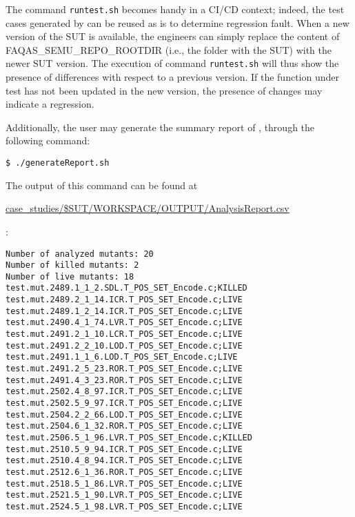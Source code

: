 The command \texttt{runtest.sh} becomes handy in a CI/CD context; indeed, the test cases generated by \SEMUS can be reused as is to determine regression fault. When a new version of the SUT is available, the engineers can simply replace the content of FAQAS\_SEMU\_REPO\_ROOTDIR (i.e., the folder with the SUT) with the newer SUT version. The execution of command \texttt{runtest.sh} will thus show the presence of differences with respect to a previous version. If the function under test has not been updated in the new version, the presence of changes may indicate a regression.

Additionally, the user may generate the summary report of \SEMUS, through the following command:

\begin{lstlisting}[language={}, label=listing:semus_results_3]
 $ ./generateReport.sh
\end{lstlisting}


The output of this command can be found at \begin{scriptsize}\url{case_studies/$SUT/WORKSPACE/OUTPUT/AnalysisReport.csv}\end{scriptsize}:

\begin{lstlisting}[language={}]
Number of analyzed mutants: 20
Number of killed mutants: 2
Number of live mutants: 18
test.mut.2489.1_1_2.SDL.T_POS_SET_Encode.c;KILLED
test.mut.2489.2_1_14.ICR.T_POS_SET_Encode.c;LIVE
test.mut.2489.1_2_14.ICR.T_POS_SET_Encode.c;LIVE
test.mut.2490.4_1_74.LVR.T_POS_SET_Encode.c;LIVE
test.mut.2491.2_1_10.LCR.T_POS_SET_Encode.c;LIVE
test.mut.2491.2_2_10.LOD.T_POS_SET_Encode.c;LIVE
test.mut.2491.1_1_6.LOD.T_POS_SET_Encode.c;LIVE
test.mut.2491.2_5_23.ROR.T_POS_SET_Encode.c;LIVE
test.mut.2491.4_3_23.ROR.T_POS_SET_Encode.c;LIVE
test.mut.2502.4_8_97.ICR.T_POS_SET_Encode.c;LIVE
test.mut.2502.5_9_97.ICR.T_POS_SET_Encode.c;LIVE
test.mut.2504.2_2_66.LOD.T_POS_SET_Encode.c;LIVE
test.mut.2504.6_1_32.ROR.T_POS_SET_Encode.c;LIVE
test.mut.2506.5_1_96.LVR.T_POS_SET_Encode.c;KILLED
test.mut.2510.5_9_94.ICR.T_POS_SET_Encode.c;LIVE
test.mut.2510.4_8_94.ICR.T_POS_SET_Encode.c;LIVE
test.mut.2512.6_1_36.ROR.T_POS_SET_Encode.c;LIVE
test.mut.2518.5_1_86.LVR.T_POS_SET_Encode.c;LIVE
test.mut.2521.5_1_90.LVR.T_POS_SET_Encode.c;LIVE
test.mut.2524.5_1_98.LVR.T_POS_SET_Encode.c;LIVE
\end{lstlisting}

